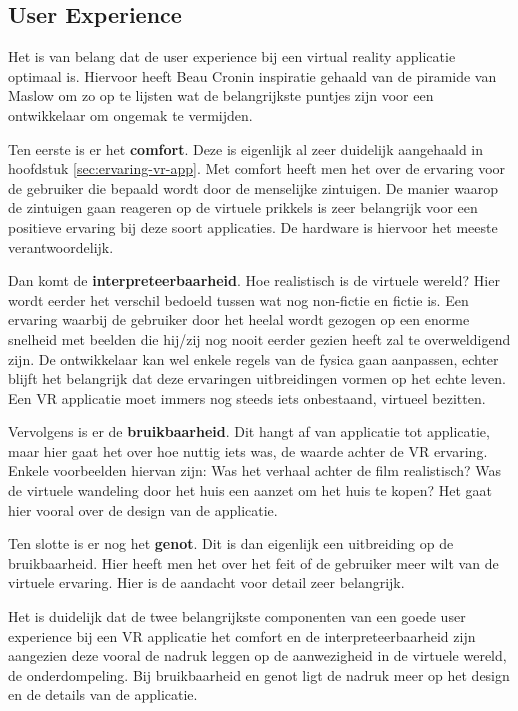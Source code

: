 \subsection{User Experience}
\label{subsec:user-experience}
Het is van belang dat de user experience bij een virtual reality applicatie optimaal is. Hiervoor heeft Beau Cronin \autocite{Cronin2015} inspiratie gehaald van de piramide van Maslow om zo op te lijsten wat de belangrijkste puntjes zijn voor een ontwikkelaar om ongemak te vermijden.

Ten eerste is er het \textbf{comfort}. Deze is eigenlijk al zeer duidelijk aangehaald in hoofdstuk \ref{sec:ervaring-vr-app}. Met comfort heeft men het over de ervaring voor de gebruiker die bepaald wordt door de menselijke zintuigen. De manier waarop de zintuigen gaan reageren op de virtuele prikkels is zeer belangrijk voor een positieve ervaring bij deze soort applicaties. De hardware is hiervoor het meeste verantwoordelijk.

Dan komt de \textbf{interpreteerbaarheid}. Hoe realistisch is de virtuele wereld? Hier wordt eerder het verschil bedoeld tussen wat nog non-fictie en fictie is. Een ervaring waarbij de gebruiker door het heelal wordt gezogen op een enorme snelheid met beelden die hij/zij nog nooit eerder gezien heeft zal te overweldigend zijn. De ontwikkelaar kan wel enkele regels van de fysica gaan aanpassen, echter blijft het belangrijk dat deze ervaringen uitbreidingen vormen op het echte leven. Een VR applicatie moet immers nog steeds iets onbestaand, virtueel bezitten.

Vervolgens is er de \textbf{bruikbaarheid}. Dit hangt af van applicatie tot applicatie, maar hier gaat het over hoe nuttig iets was, de waarde achter de VR ervaring. Enkele voorbeelden hiervan zijn: Was het verhaal achter de film realistisch? Was de virtuele wandeling door het huis een aanzet om het huis te kopen? Het gaat hier vooral over de design van de applicatie.

Ten slotte is er nog het \textbf{genot}. Dit is dan eigenlijk een uitbreiding op de bruikbaarheid. Hier heeft men het over het feit of de gebruiker meer wilt van de virtuele ervaring. Hier is de aandacht voor detail zeer belangrijk.

Het is duidelijk dat de twee belangrijkste componenten van een goede user experience bij een VR applicatie het comfort en de interpreteerbaarheid zijn aangezien deze vooral de nadruk leggen op de aanwezigheid in de virtuele wereld, de onderdompeling. Bij bruikbaarheid en genot ligt de nadruk meer op het design en de details van de applicatie.

